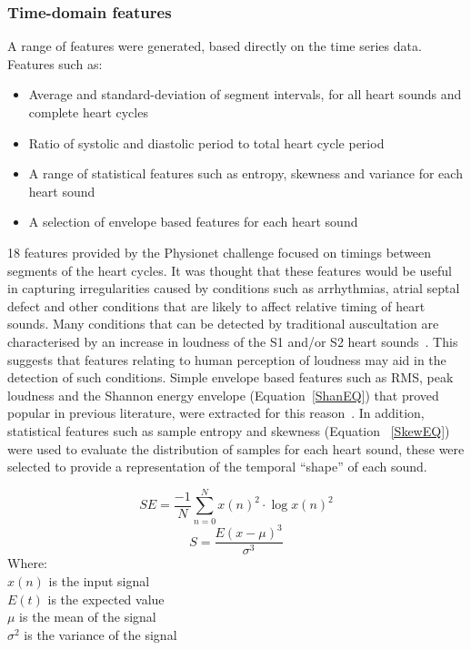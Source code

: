 \documentclass[titlepage, 12pt]{scrartcl} \usepackage{enumitem}
\begin{document}
\subsubsection{Time-domain features}\label{Time}
A range of features were generated, based directly on the time series data.
Features such as:
\begin{itemize}
    \item Average and standard-deviation of segment intervals, for all heart
        sounds and complete heart cycles
    \item Ratio of systolic and diastolic period to total heart cycle period
    \item A range of statistical features such as entropy, skewness and variance for
        each heart sound
    \item A selection of envelope based features for each heart sound
\end{itemize}

18 features provided by the Physionet challenge focused on timings between
segments of the heart cycles. It was thought that these features would be
useful in capturing irregularities caused by conditions such as arrhythmias,
atrial septal defect and other conditions that are likely to affect relative
timing of heart sounds.
Many conditions that can be detected by traditional auscultation are
characterised by an increase in loudness of the S1 and/or S2 heart
sounds~\parencite{Brown2008}. This suggests that features relating to human
perception of loudness may aid in the detection of such conditions.  Simple
envelope based features such as RMS, peak loudness and the Shannon energy
envelope (Equation~\ref{ShanEQ}) that proved popular in previous literature,
were extracted for this reason~\parencite[p.73-77]{Lerch2012}. In addition,
statistical features such as sample entropy and skewness (Equation
~\ref{SkewEQ}) were used to evaluate the distribution of samples for each heart
sound, these were selected to provide a representation of the temporal
``shape'' of each sound.

\begin{equation}\label{ShanEQ}
    SE = \frac{-1}{N}\sum\limits_{n=0}^N x(n)^2\cdot \log{x(n)^2}
\end{equation}
\begin{equation}\label{SkewEQ}
    S=\frac{E(x-\mu)^3}{\sigma^3}
\end{equation}
Where:\\
$x(n)$ is the input signal\\
$E(t)$ is the expected value\\
$\mu$ is the mean of the signal\\
$\sigma^2$ is the variance of the signal
\end{document}
